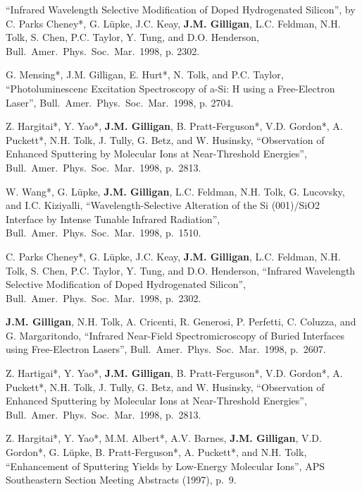     \item \enquote{Infrared Wavelength Selective Modification of Doped Hydrogenated Silicon},
    by C. Parks Cheney*, G. L{\"u}pke, J.C. Keay, \textbf{J.M. Gilligan}, L.C. Feldman, N.H. Tolk, S. Chen, P.C. Taylor, Y. Tung, and D.O. Henderson, 
    Bull.\ Amer.\ Phys.\ Soc.\ Mar.~1998, p. 2302.

\item
  G. Mensing*, J.M. Gilligan, E. Hurt*, N. Tolk, and P.C. Taylor,
  \enquote{Photoluminescenc Excitation Spectroscopy of a-Si: H using a Free-Electron Laser},
Bull.\ Amer.\ Phys.\ Soc.\ Mar.~1998, p. 2704.

\item
  Z. Hargitai*, Y. Yao*, \textbf{J.M. Gilligan}, B. Pratt-Ferguson*, V.D. Gordon*, A. Puckett*, N.H. Tolk, J. Tully, G. Betz, and W. Husinsky,
  \enquote{Observation of Enhanced Sputtering by Molecular Ions at Near-Threshold Energies},
Bull.\ Amer.\ Phys.\ Soc.\ Mar.~1998, p.~2813.

\item
  W. Wang*, G. L{\"u}pke, \textbf{J.M. Gilligan}, L.C. Feldman, N.H. Tolk, G. Lucovsky, and I.C. Kiziyalli,
  \enquote{Wavelength-Selective Alteration of the Si (001)/SiO2 Interface by Intense Tunable Infrared Radiation},
Bull.\ Amer.\ Phys.\ Soc.\ Mar.~1998, p.~1510.

\item
  C. Parks Cheney*, G. L\"upke, J.C. Keay, \textbf{J.M. Gilligan}, L.C. Feldman, N.H. Tolk, S. Chen, P.C. Taylor, Y. Tung, and D.O. Henderson,
  \enquote{Infrared Wavelength Selective Modification of Doped Hydrogenated Silicon},
Bull.\ Amer.\ Phys.\ Soc.\ Mar.~1998, p.~2302.

\item
  \textbf{J.M. Gilligan}, N.H. Tolk, A. Cricenti, R. Generosi, P. Perfetti, C. Coluzza, and G. Margaritondo,
  \enquote{Infrared Near-Field Spectromicroscopy of Buried Interfaces using Free-Electron Lasers},
Bull.\ Amer.\ Phys.\ Soc.\ Mar.~1998, p.~2607.

\item
  Z. Hartigai*, Y. Yao*, \textbf{J.M. Gilligan}, B. Pratt-Ferguson*, V.D. Gordon*, A. Puckett*, N.H. Tolk, J. Tully, G. Betz, and W. Husinsky,
  \enquote{Observation of Enhanced Sputtering by Molecular Ions at Near-Threshold Energies},
Bull.\ Amer.\ Phys.\ Soc.\ Mar.~1998, p.~2813.


\item
  Z. Hargitai*, Y. Yao*, M.M. Albert*, A.V. Barnes, \textbf{J.M. Gilligan}, V.D. Gordon*, G. L{\"u}pke, B. Pratt-Ferguson*, A. Puckett*, and N.H. Tolk,
  \enquote{Enhancement of Sputtering Yields by Low-Energy Molecular Ions},
  APS Southeastern Section Meeting Abstracts (1997), p.~9.

